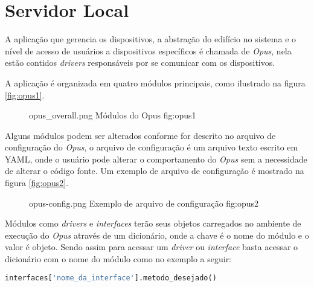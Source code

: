 \section{\textbf{Servidor Local}}
\label{opus}

A aplicação que gerencia os dispositivos, a abstração do edifício no sistema e o nível de acesso de usuários a dispositivos específicos
é chamada de \emph{Opus}, nela estão contidos \emph{drivers} responsáveis por se comunicar com os dispositivos.

A aplicação é organizada em quatro módulos principais, como ilustrado na figura \ref{fig:opus1}.
\begin{figure}[h!]
    {opus_overall.png}
    {Módulos do Opus}
    {fig:opus1}
\end{figure}

Alguns módulos podem ser alterados conforme for descrito no arquivo de configuração do \emph{Opus}, o arquivo de configuração é um arquivo texto
escrito em YAML, onde o usuário pode alterar o comportamento do \emph{Opus} sem a necessidade de alterar o código fonte.
Um exemplo de arquivo de configuração é mostrado na figura \ref{fig:opus2}.
\begin{figure}[h!]
    {opus-config.png}
    {Exemplo de arquivo de configuração}
    {fig:opus2}
\end{figure}


Módulos como \emph{drivers} e \emph{interfaces} terão seus objetos carregados no ambiente de execução do \emph{Opus}
através de um dicionário, onde a chave é o nome do módulo e o valor é objeto.
Sendo assim para acessar um \emph{driver} ou \emph{interface} basta acessar o dicionário com o nome do módulo como no exemplo
a seguir:
\begin{lstlisting}[language=Python]
    interfaces['nome_da_interface'].metodo_desejado()
\end{lstlisting}